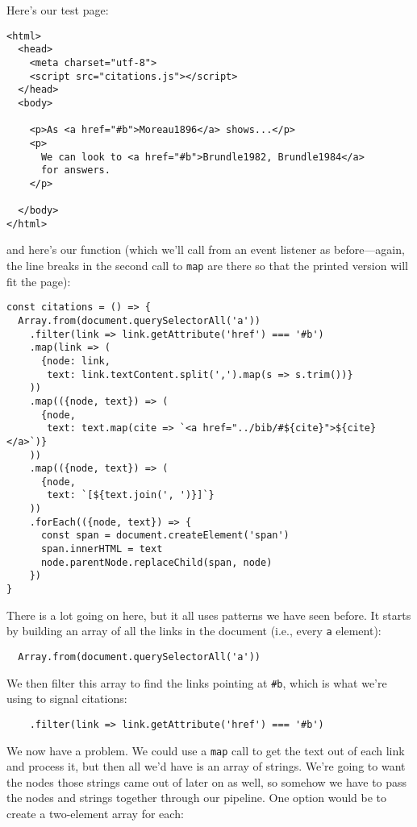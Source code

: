 Here's our test page:

\begin{verbatim}
<html>
  <head>
    <meta charset="utf-8">
    <script src="citations.js"></script>
  </head>
  <body>

    <p>As <a href="#b">Moreau1896</a> shows...</p>
    <p>
      We can look to <a href="#b">Brundle1982, Brundle1984</a>
      for answers.
    </p>

  </body>
</html>
\end{verbatim}

\noindent
and here's our function
(which we'll call from an event listener as before---again,
the line breaks in the second call to \texttt{map} are there
so that the printed version will fit the page):

\begin{verbatim}
const citations = () => {
  Array.from(document.querySelectorAll('a'))
    .filter(link => link.getAttribute('href') === '#b')
    .map(link => (
      {node: link,
       text: link.textContent.split(',').map(s => s.trim())}
    ))
    .map(({node, text}) => (
      {node,
       text: text.map(cite => `<a href="../bib/#${cite}">${cite}</a>`)}
    ))
    .map(({node, text}) => (
      {node,
       text: `[${text.join(', ')}]`}
    ))
    .forEach(({node, text}) => {
      const span = document.createElement('span')
      span.innerHTML = text
      node.parentNode.replaceChild(span, node)
    })
}
\end{verbatim}

There is a lot going on here,
but it all uses patterns we have seen before.
It starts by building an array of all the links in the document
(i.e., every \texttt{a} element):

\begin{verbatim}
  Array.from(document.querySelectorAll('a'))
\end{verbatim}

We then filter this array to find the links pointing at \texttt{\#b},
which is what we're using to signal citations:

\begin{verbatim}
    .filter(link => link.getAttribute('href') === '#b')
\end{verbatim}

We now have a problem.
We could use a \texttt{map} call to get the text out of each link and process it,
but then all we'd have is an array of strings.
We're going to want the nodes those strings came out of later on as well,
so somehow we have to pass the nodes and strings together through our pipeline.
One option would be to create a two-element array for each:

